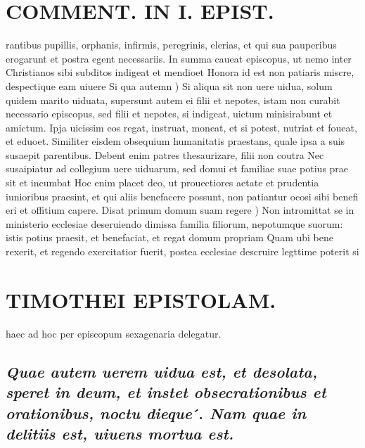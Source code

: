 \documentclass{article}
\begin{document}
\begin{pages}
\section*{COMMENT. IN I. EPIST. }
\marginpar{[ p.118 ]}\pstart rantibus pupillis, orphanis, infirmis, peregrinis, elerias, et qui sua pauperibus erogarunt et postra egent necessariis. In summa caueat episcopus, ut nemo inter Christianos sibi subditos indigeat et mendioet Honora id est non patiaris miscre, despectique eam uiuere  \pend\pstart Si qua autemn ) Si aliqua sit non uere uidua, solum quidem marito uiduata, supersunt autem ei filii et nepotes, istam non curabit necessario episcopus, sed filii et nepotes, si indigeat, uictum minisirabunt et amictum. Ipja uicissim eos regat, instruat, moneat, et si potest, nutriat et foueat, et eduoet. Similiter eisdem obsequium humanitatis praestans, quale ipsa a suis susaepit parentibus. Debent enim patres thesaurizare, filii non coutra Nec susaipiatur ad collegium uere uiduarum, sed domui et familiae suae potius prae sit et incumbat Hoc enim placet deo, ut prouectiores aetate et prudentia iunioribus praesint, et qui aliis benefacere possunt, non patiantur ocosi sibi benefi eri et offitium capere.  \pend\pstart Disat primum domum suam regere ) Non intromittat se in ministerio ecclesiae deseruiendo dimissa familia filiorum, nepotumque suorum: istis potius praesit, et benefaciat, et regat domum propriam Quam ubi bene rexerit, et regendo exercitatior fuerit, postea ecclesiae descruire legttime poterit si  \pend
\section*{TIMOTHEI EPISTOLAM. }
\marginpar{[ p.119 ]}\pstart haec ad hoc per episcopum sexagenaria delegatur.  \pend
{}
{}
\subsection*{\textit{Quae autem uerem uidua est, et desolata, speret in deum, et instet obsecrationibus et orationibus, noctu dieque ́. Nam quae in delitiis est, uiuens mortua est. }}
{}

\end{pages}
\end{document}
